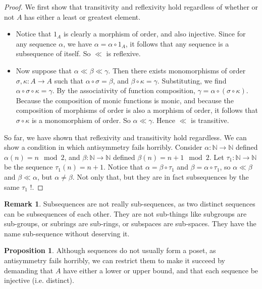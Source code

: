 \documentclass[11pt]{article}
\newcommand{\N}{\mathbb{N}}
\theoremstyle{definition}
\newtheorem{proposition}{Proposition}
\newtheorem{remark}{Remark}
\begin{document}
\begin{proof}

We first show that transitivity and reflexivity hold regardless of whether or not $A$ has either a least or greatest element. \\

\begin{itemize}
\item
Notice that $1_A$ is clearly a morphism of order, and also injective. Since for any sequence $\alpha$, we have $\alpha = \alpha\circ 1_A$, it follows that any sequence is a subsequence of itself. So $\ll$ is reflexive.

\item 
Now suppose that $\alpha\ll\beta\ll \gamma$. Then there exists monomorphisms of order $\sigma,\kappa:A\to A$ such that $\alpha\circ \sigma = \beta$, and $\beta\circ\kappa = \gamma$. Substituting, we find $\alpha\circ \sigma\circ \kappa  = \gamma$. By the associativity of function composition, $\gamma = \alpha\circ(\sigma\circ\kappa)$. Because the composition of monic functions is monic, and because the composition of morphisms of order is also a morphism of order, it follows that $\sigma\circ \kappa$ is a monomorphism of order. So $\alpha\ll \gamma$. Hence $\ll$ is transitive.

\end{itemize}

So far, we have shown that reflexivity and transitivity hold regardless. We can show a condition in which antisymmetry fails horribly. Consider $\alpha:\N\to \N$ defined $\alpha(n) = n\mod 2$, and $\beta:\N\to \N$ defined $\beta(n) = n+1\mod 2$. Let $\tau_1:\N\to \N$ be the sequence $\tau_1(n) = n + 1$. Notice that $\alpha = \beta\circ \tau_1 $ and $\beta = \alpha\circ \tau_1$, so $\alpha\ll \beta$ and $\beta \ll \alpha $, but $\alpha\ne \beta$. Not only that, but they are in fact subsequences by the same $\tau_1$ !. 

\end{proof}

\begin{remark}
Subsequences are not really sub-sequences, as two distinct sequences can be subsequences of each other. They are not sub-things like subgroups are sub-groups, or subrings are sub-rings, or subspaces are sub-spaces. They have the name sub-sequence without deserving it.
\end{remark}

\begin{proposition}
Although sequences do not usually form a poset, as antisymmetry fails horribly, we can restrict them to make it succeed by demanding that $A$ have either a lower or upper bound, and that each sequence be injective (i.e. distinct).
\end{proposition}
\end{document}
